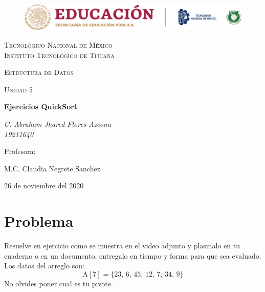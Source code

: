 \documentclass[letterpaper, 12pt]{article}
\begin{document}
    
    \begin{titlepage}
        \begin{figure}[ht]
            \centering
            \includegraphics[width=15cm]{logosITT.png}
        \end{figure}
        \centering
        {\scshape\LARGE Tecnológico Nacional de México\\Instituto Tecnológico de Tijuana\par}
        \vspace{1cm}
        {\scshape\Large Estructura de Datos\par}
        \vspace{1cm}
        {\scshape\Large Unidad 5\par}
        \vspace{1.5cm}
        {\huge\bfseries Ejercicios QuickSort\par}
        \vspace{2cm}
        {\Large\itshape C. Abraham Jhared Flores Azcona\\19211640\par}
        \vfill
        Profesora: \par
        M.C. Claudia Negrete Sanchez
        
        \vfill

        {\large 26 de noviembre del 2020}
    \end{titlepage}

    \newpage
    \thispagestyle{fancy}
    \setcounter{page}{1}
    \section{Problema}
    Resuelve en ejercicio como se muestra en el video adjunto y plasmalo en tu cuaderno o en un documento, entregalo en tiempo y forma para que sea evaluado. Los datos del arreglo son:
    \[\text{A}[7]=\{23,\,6,\,45,\,12,\,7,\,34,\,9\}\]
    No olvides poner cual es tu pivote. 
\end{document}
